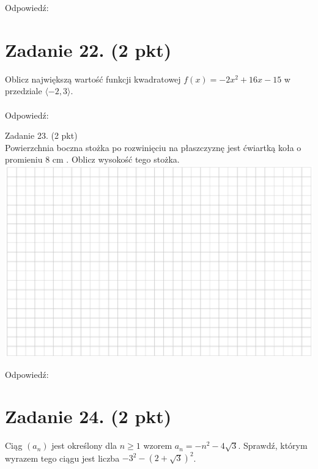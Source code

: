 \documentclass[10pt]{article}
\begin{document}
Odpowiedź:

\section*{Zadanie 22. (2 pkt)}
Oblicz największą wartość funkcji kwadratowej \(f(x)=-2 x^{2}+16 x-15\) w przedziale \(\langle-2,3\rangle\).\\
\(\qquad\)\\
Odpowiedź: \(\qquad\)

Zadanie 23. (2 pkt)\\
Powierzchnia boczna stożka po rozwinięciu na płaszczyznę jest ćwiartką koła o promieniu 8 cm . Oblicz wysokość tego stożka.\\
\includegraphics[max width=\textwidth, center]{2024_11_21_2c2c97b7feae6d70b078g-09(1)}

Odpowiedź:

\section*{Zadanie 24. (2 pkt)}
Ciąg \(\left(a_{n}\right)\) jest określony dla \(n \geq 1\) wzorem \(a_{n}=-n^{2}-4 \sqrt{3}\). Sprawdź, którym wyrazem tego ciągu jest liczba \(-3^{2}-(2+\sqrt{3})^{2}\).
\end{document}
